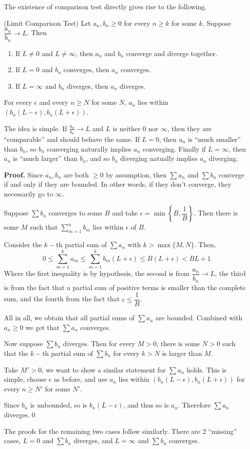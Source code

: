 The existence of comparison test directly gives rise to the following.
\begin{SNP}{\thm}{(Limit Comparison Test) Let $a_n, b_n \geq 0$ for every $n \geq k$ for some $k$. Suppose $\dfrac {a_n}{b_n} \to L$. Then
\begin{enumerate}
	\item If $L \neq 0$ and $L \neq \infty$, then $a_n$ and $b_n$ converge and diverge together.
	\item If $L = 0$ and $b_n$ converges, then $a_n$ converges.
	\item If $L = \infty$ and $b_n$ diverges, then $a_n$ diverges.
\end{enumerate}}For every $\epsilon$ and every $n \geq N$ for some $N$, $a_n$ lies within $(b_n(L - \epsilon), b_n(L + \epsilon))$.
\end{SNP}
The idea is simple. If $\frac{a_n}{b_n} \to L$ and $L$ is neither $0$ nor $\infty$, then they are ``comparable'' and should behave the same. If $L = 0$, then $a_n$ is ``much smaller'' than $b_n$, so $b_n$ converging naturally implies $a_n$ converging. Finally if $L = \infty$, then $a_n$ is ``much larger'' than $b_n$, and so $b_n$ diverging natually implies $a_n$ diverging.
\begin{smrg}\textbf{Proof.} Since $a_n, b_n$ are both $\geq 0$ by assumption, then $\sum a_n$ and $\sum b_n$ converge if and only if they are bounded. In other words, if they don't converge, they necessarily go to $\infty$.

Suppose $\sum b_n$ converges to some $B$ and take $\epsilon = \min\left\{B, \dfrac 1 B\right\}$. Then there is some $M$ such that $\sum\limits_{m = 1}^{n}b_m$ lies within $\epsilon$ of $B$.

Consider the $k-$th partial sum of $\sum a_n$ with $k > \max\{M, N\}$. Then,
$$
0 \leq \sum\limits_{m = 1}^{k}a_m \leq \sum\limits_{m = 1}^{k}b_m(L + \epsilon) \leq B(L + \epsilon) < BL + 1
$$
Where the first inequality is by hypothesis, the second is from $\dfrac{a_n}{b_n} \to L$, the third is from the fact that a partial sum of positive terms is smaller than the complete sum, and the fourth from the fact that $\epsilon \leq \dfrac 1 B$.

All in all, we obtain that all partial sums of $\sum a_n$ are bounded. Combined with $a_n \geq 0$ we get that $\sum a_n$ converges.

Now suppose $\sum b_n$ diverges. Then for every $M > 0$, there is some $N > 0$ such that the $k-$th partial sum of $\sum b_n$ for every $k > N$ is larger than $M$.

Take $M' > 0$, we want to show a similar statement for $\sum a_n$ holds. This is simple, choose $\epsilon$ as before, and use $a_n$ lies within $(b_n(L - \epsilon), b_n(L + \epsilon))$ for every $n \geq N'$ for some $N'$.

Since $b_n$ is unbounded, so is $b_n(L - \epsilon)$, and thus so is $a_n$. Therefore $\sum a_n$ diverges.\qed
\end{smrg}
The proofs for the remaining two cases follow similarly. There are 2 ``missing'' cases, $L = 0$ and $\sum b_n$ diverges, and $L = \infty$ and $\sum b_n$ converges.

